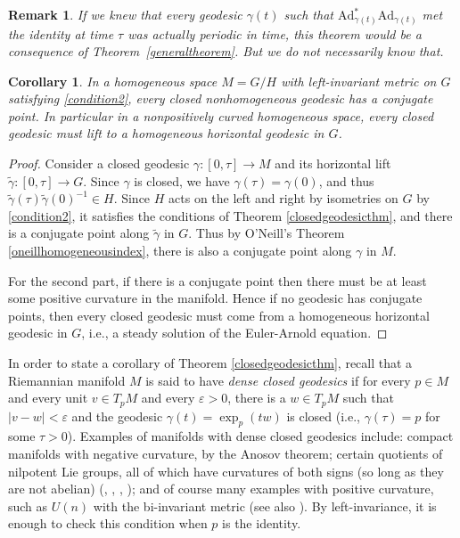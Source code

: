 \documentclass[oneside, 11pt]{amsart}
\newtheorem{remark}[theorem]{Remark}
\newtheorem{corollary}[theorem]{Corollary}
\numberwithin{equation}{section}
\newcommand{\Ad}{\mathrm{Ad}}
\begin{document}
\begin{remark} If we knew that every   
geodesic $\gamma(t)$ such that 
$\Ad_{\gamma(t)}^*\Ad_{\gamma(t)}$ 
met the identity at time $\tau$ was actually periodic in time, this theorem would be a consequence of Theorem~\ref{generaltheorem}. But we do not necessarily know that.\end{remark}

 


\begin{corollary}\label{homogeneousclosed}
In a homogeneous space $M=G/H$ with left-invariant metric on $G$ satisfying \eqref{condition2}, every closed nonhomogeneous geodesic has a conjugate point. In particular in a nonpositively curved homogeneous space, every closed geodesic must lift to a homogeneous horizontal geodesic in $G$. 
\end{corollary}

\begin{proof}
    Consider a closed geodesic $\gamma\colon [0,\tau]\to M$ and its horizontal lift $\tilde{\gamma}\colon [0,\tau]\to G$. Since $\gamma$ is closed, we have $\gamma(\tau)=\gamma(0)$, and thus $\tilde{\gamma}(\tau)\tilde{\gamma}(0)^{-1}\in H$. Since $H$ acts on the left and right by isometries on $G$ by \eqref{condition2}, it satisfies the conditions of Theorem \ref{closedgeodesicthm}, and there is a conjugate point along $\tilde{\gamma}$ in $G$. Thus by O'Neill's Theorem \ref{oneillhomogeneousindex}, there is also a conjugate point along $\gamma$ in $M$.

    For the second part, if there is a conjugate point then there must be at least some positive curvature in the manifold. Hence if no geodesic has conjugate points, then every closed geodesic must come from a homogeneous horizontal geodesic in $G$, i.e., a steady solution of the Euler-Arnold equation.
\end{proof}



In order to state a corollary of Theorem \ref{closedgeodesicthm}, recall that a Riemannian manifold $M$ is said to have \emph{dense closed geodesics} if for every $p\in M$ and every unit $v\in T_pM$ and every $\varepsilon>0$, there is a $w\in T_pM$ such that $\lvert v-w\rvert < \varepsilon$ and the geodesic $\gamma(t)=\exp_p(tw)$ is closed (i.e., $\gamma(\tau)=p$ for some $\tau>0$). Examples of manifolds with dense closed geodesics include: compact manifolds with negative curvature, by the Anosov theorem; certain quotients of nilpotent Lie groups, all of which have curvatures of both signs (so long as they are not abelian) (\cite{deMeyer}, \cite{Eberlein}, \cite{LeePark}, \cite{Mast}); and of course many examples with positive curvature, such as $U(n)$ with the bi-invariant metric (see also \cite{Besse}). By left-invariance, it is enough to check this condition when $p$ is the identity. 
\end{document}
